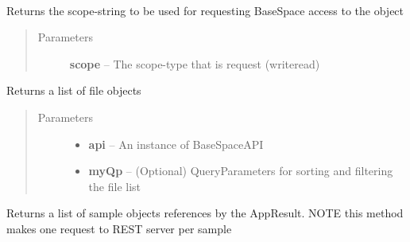 \documentclass[letterpaper,10pt,english]{sphinxmanual}
\begin{document}
\begin{fulllineitems}
\label{Available modules:BaseSpacePy.model.AppResult.AppResult}~

\begin{fulllineitems}
\label{Available modules:BaseSpacePy.model.AppResult.AppResult.getAccessStr}
Returns the scope-string to be used for requesting BaseSpace access to the object
\begin{quote}\begin{description}
\item[{Parameters}] \leavevmode
\textbf{scope} -- The scope-type that is request (write\textbar{}read)

\end{description}\end{quote}

\end{fulllineitems}


\begin{fulllineitems}
\label{Available modules:BaseSpacePy.model.AppResult.AppResult.getFiles}
Returns a list of file objects
\begin{quote}\begin{description}
\item[{Parameters}] \leavevmode\begin{itemize}
\item {} 
\textbf{api} -- An instance of BaseSpaceAPI

\item {} 
\textbf{myQp} -- (Optional) QueryParameters for sorting and filtering the file list

\end{itemize}

\end{description}\end{quote}

\end{fulllineitems}


\begin{fulllineitems}
\label{Available modules:BaseSpacePy.model.AppResult.AppResult.getReferencedSamples}
Returns a list of sample objects references by the AppResult. NOTE this method makes one request to REST server per sample


\end{fulllineitems}
\end{fulllineitems}
\end{document}
